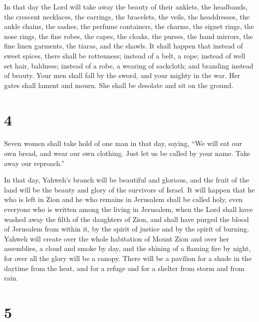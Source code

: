  In that day the Lord will take away the beauty of their
anklets, the headbands, the crescent necklaces,  the
earrings, the bracelets, the veils,  the headdresses, the
ankle chains, the sashes, the perfume containers, the charms,
 the signet rings, the nose rings,  the fine
robes, the capes, the cloaks, the purses,  the hand
mirrors, the fine linen garments, the tiaras, and the shawls.
 It shall happen that instead of sweet spices, there shall
be rottenness; instead of a belt, a rope; instead of well set hair,
baldness; instead of a robe, a wearing of sackcloth; and branding
instead of beauty.  Your men shall fall by the sword, and
your mighty in the war.  Her gates shall lament and mourn.
She shall be desolate and sit on the ground.

\hypertarget{section-3}{%
\section{4}\label{section-3}}

 Seven women shall take hold of one man in that day, saying,
``We will eat our own bread, and wear our own clothing. Just let us be
called by your name. Take away our reproach.''

 In that day, Yahweh's branch will be beautiful and
glorious, and the fruit of the land will be the beauty and glory of the
survivors of Israel.  It will happen that he who is left in
Zion and he who remains in Jerusalem shall be called holy, even everyone
who is written among the living in Jerusalem,  when the Lord
shall have washed away the filth of the daughters of Zion, and shall
have purged the blood of Jerusalem from within it, by the spirit of
justice and by the spirit of burning.  Yahweh will create
over the whole habitation of Mount Zion and over her assemblies, a cloud
and smoke by day, and the shining of a flaming fire by night, for over
all the glory will be a canopy.  There will be a pavilion
for a shade in the daytime from the heat, and for a refuge and for a
shelter from storm and from rain.

\hypertarget{section-4}{%
\section{5}\label{section-4}}

